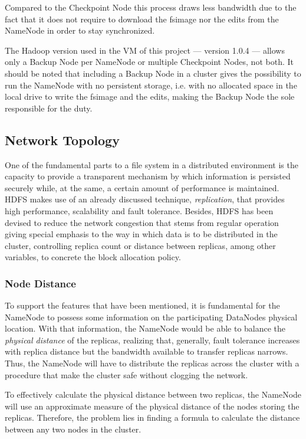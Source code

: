 Compared to the Checkpoint Node this process draws less bandwidth due to the fact that it does not require to download the fsimage nor the edits from the NameNode in order to stay synchronized.

The Hadoop version used in the VM of this project --- version 1.0.4 --- allows only a Backup Node per NameNode or multiple Checkpoint Nodes, not both. It should be noted that including a Backup Node in a cluster gives the possibility to run the NameNode with no persistent storage, i.e. with no allocated space in the local drive to write the fsimage and the edits, making the Backup Node the sole responsible for the duty.

\subsection{Network Topology}\label{subsec:topologiared}
\noindent One of the fundamental parts to a file system in a distributed environment is the capacity to provide a transparent mechanism by which information is persisted securely while, at the same, a certain amount of performance is maintained. HDFS makes use of an already discussed technique, \emph{replication}, that provides high performance, scalability and fault tolerance. Besides, HDFS has been devised to reduce the network congestion that stems from regular operation giving special emphasis to the way in which data is to be distributed in the cluster, controlling replica count or distance between replicas, among other variables, to concrete the block allocation policy.

\subsubsection{Node Distance}\label{subsubsec:distnodos}
\noindent To support the features that have been mentioned, it is fundamental for the NameNode to possess some information on the participating DataNodes physical location. With that information, the NameNode would be able to balance the \emph{physical distance} of the replicas, realizing that, generally, fault tolerance increases with replica distance but the bandwidth available to transfer replicas narrows. Thus, the NameNode will have to distribute the replicas across the cluster with a procedure that make the cluster safe without clogging the network.

To effectively calculate the physical distance between two replicas, the NameNode will use an approximate measure of the physical distance of the nodes storing the replicas. Therefore, the problem lies in finding a formula to calculate the distance between any two nodes in the cluster.

